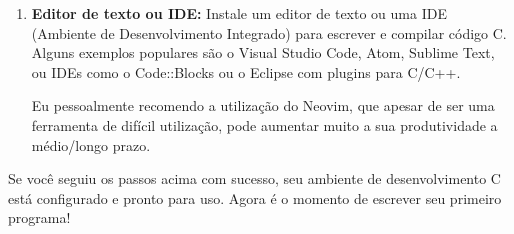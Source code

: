 \begin{enumerate}
\begin{enumerate}
                \begin{textbox}[]
                gcc --version
                \end{textbox}
        \end{enumerate}

    \item \textbf{Editor de texto ou IDE:} 
        Instale um editor de texto ou uma IDE (Ambiente de Desenvolvimento 
        Integrado) para escrever e compilar código C. Alguns exemplos 
        populares são o Visual Studio Code, Atom, Sublime Text, ou IDEs como o 
        Code::Blocks ou o Eclipse com plugins para C/C++.

        \footnotesize Eu pessoalmente recomendo a utilização do Neovim, que 
        apesar de ser uma ferramenta de difícil utilização, pode aumentar 
        muito a sua produtividade a médio/longo prazo.
\end{enumerate}

Se você seguiu os passos acima com sucesso, seu ambiente de desenvolvimento C 
está configurado e pronto para uso. Agora é o momento de escrever seu primeiro 
programa!
